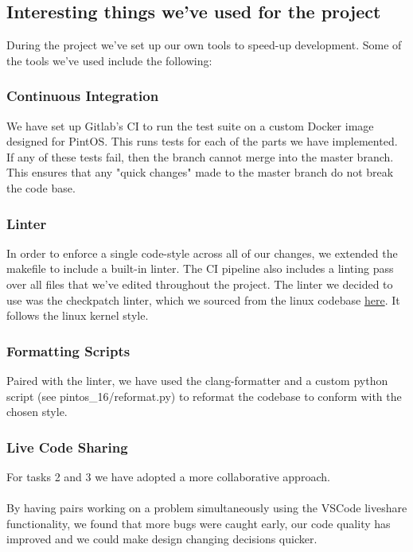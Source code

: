 \documentclass{report}
\begin{document}
		\subsection*{Interesting things we've used for the project}
		During the project we've set up our own tools to speed-up development. Some
		of the tools we've used include the following:

			\subsubsection*{Continuous Integration}
			We have set up Gitlab's CI to run the test suite on a custom Docker image 
			designed for PintOS. This runs tests for
			each of the parts we have implemented. If any of these tests fail, then the 
			branch cannot merge into the master branch. This ensures that any "quick changes" 
			made to the master branch do not break the code base.
			
			\subsubsection*{Linter}
			In order to enforce a single code-style across all of our changes, we 
			extended the makefile to include a built-in linter. The CI pipeline also 
			includes a linting pass over all files that we've edited throughout the 
			project. The linter we decided to use was the checkpatch linter, which 
			we sourced from the linux codebase 
			\href{https://github.com/torvalds/linux/blob/master/scripts/checkpatch.pl}{here}. 
			It follows the linux kernel style.
			
			\subsubsection*{Formatting Scripts}
			Paired with the linter, we have used the clang-formatter and a custom 
			python script (see pintos\_16/reformat.py) to reformat the codebase to 
			conform with the chosen style. 

			\subsubsection*{Live Code Sharing}
			For tasks 2 and 3 we have adopted a more collaborative approach.
			\\
			\\ By having pairs working on a problem simultaneously using the
			VSCode liveshare functionality, we found that more bugs were caught early, 
			our code quality has improved and we could make design changing decisions 
			quicker.
\end{document}
